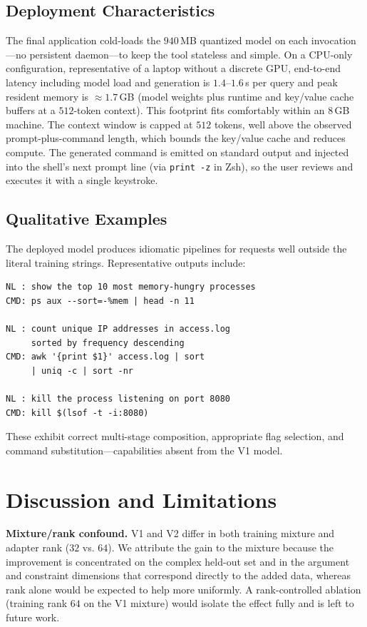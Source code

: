 \documentclass[conference]{IEEEtran}
\begin{document}
\subsection{Deployment Characteristics}

The final application cold-loads the $940$\,MB quantized model on each
invocation---no persistent daemon---to keep the tool stateless and simple. On a
CPU-only configuration, representative of a laptop without a discrete GPU, end-to-end
latency including model load and generation is $1.4$--$1.6$\,s per query and peak
resident memory is $\approx 1.7$\,GB (model weights plus runtime and key/value
cache buffers at a $512$-token context). This footprint fits comfortably within
an $8$\,GB machine. The context window is capped at $512$ tokens, well above the
observed prompt-plus-command length, which bounds the key/value cache and reduces
compute. The generated command is emitted on standard output and injected into
the shell's next prompt line (via \texttt{print -z} in Zsh), so the user reviews
and executes it with a single keystroke.

\subsection{Qualitative Examples}

The deployed model produces idiomatic pipelines for requests well outside the
literal training strings. Representative outputs include:
\begin{lstlisting}
NL : show the top 10 most memory-hungry processes
CMD: ps aux --sort=-%mem | head -n 11

NL : count unique IP addresses in access.log
     sorted by frequency descending
CMD: awk '{print $1}' access.log | sort
     | uniq -c | sort -nr

NL : kill the process listening on port 8080
CMD: kill $(lsof -t -i:8080)
\end{lstlisting}
These exhibit correct multi-stage composition, appropriate flag selection, and
command substitution---capabilities absent from the V1 model.

\section{Discussion and Limitations}
\label{sec:discussion}

\textbf{Mixture/rank confound.} V1 and V2 differ in both training mixture and
adapter rank ($32$ vs. $64$). We attribute the gain to the mixture because the
improvement is concentrated on the complex held-out set and in the argument and
constraint dimensions that correspond directly to the added data, whereas rank
alone would be expected to help more uniformly. A rank-controlled ablation
(training rank $64$ on the V1 mixture) would isolate the effect fully and is left
to future work.
\end{document}
